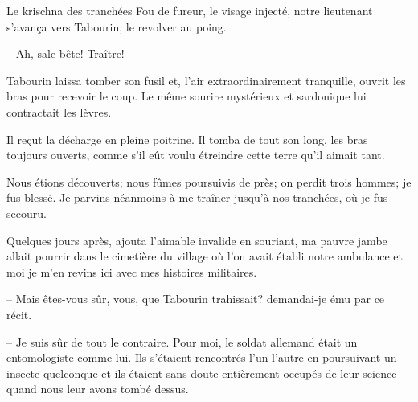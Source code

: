 \begin{chapter}{Le krischna des tranchées}
Fou de fureur, le visage injecté, notre lieutenant s'avança vers
Tabourin, le revolver au poing.

-- Ah, sale bête! Traître!

Tabourin laissa tomber son fusil et, l'air extraordinairement
tranquille, ouvrit les bras pour recevoir le coup. Le même sourire
mystérieux et sardonique lui contractait les lèvres.

Il reçut la décharge en pleine poitrine. Il tomba de tout son long, les
bras toujours ouverts, comme s'il eût voulu étreindre cette terre qu'il
aimait tant.

Nous étions découverts; nous fûmes poursuivis de près; on perdit trois
hommes; je fus blessé. Je parvins néanmoins à me traîner jusqu'à nos
tranchées, où je fus secouru.

Quelques jours après, ajouta l'aimable invalide en souriant, ma pauvre
jambe allait pourrir dans le cimetière du village où l'on avait établi
notre ambulance et moi je m'en revins ici avec mes histoires
militaires.

-- Mais êtes-vous sûr, vous, que Tabourin trahissait? demandai-je ému par
ce récit.

-- Je suis sûr de tout le contraire. Pour moi, le soldat allemand était
un entomologiste comme lui. Ils s'étaient rencontrés l'un l'autre en
poursuivant un insecte quelconque et ils étaient sans doute entièrement
occupés de leur science quand nous leur avons tombé dessus.

\end{chapter}

